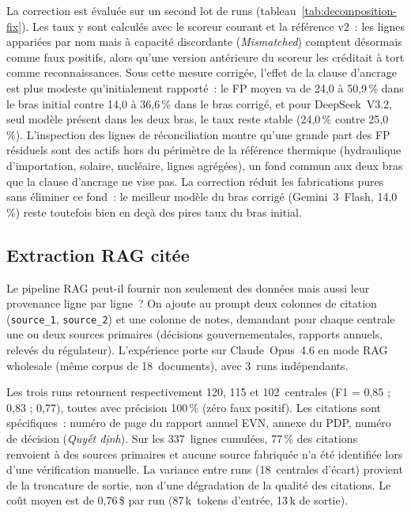 \documentclass[a4paper,11pt]{report}
\begin{document}
La correction est évaluée sur un second lot de runs (tableau~\ref{tab:decomposition-fix}). Les taux y sont calculés avec le scoreur courant et la référence v2~: les lignes appariées par nom mais à capacité discordante (\emph{Mismatched}) comptent désormais comme faux positifs, alors qu'une version antérieure du scoreur les créditait à tort comme reconnaissances. Sous cette mesure corrigée, l'effet de la clause d'ancrage est plus modeste qu'initialement rapporté~: le FP moyen va de 24,0 à 50,9\,\% dans le bras initial contre 14,0 à 36,6\,\% dans le bras corrigé, et pour DeepSeek~V3.2, seul modèle présent dans les deux bras, le taux reste stable (24,0\,\% contre 25,0\,\%). L'inspection des lignes de réconciliation montre qu'une grande part des FP résiduels sont des actifs hors du périmètre de la référence thermique (hydraulique d'importation, solaire, nucléaire, lignes agrégées), un fond commun aux deux bras que la clause d'ancrage ne vise pas. La correction réduit les fabrications pures sans éliminer ce fond~: le meilleur modèle du bras corrigé (Gemini~3~Flash, 14,0\,\%) reste toutefois bien en deçà des pires taux du bras initial.


\subsection{Extraction RAG citée}\label{sec:rag_cited}

Le pipeline RAG peut-il fournir non seulement des données mais aussi leur provenance ligne par ligne~? On ajoute au prompt deux colonnes de citation (\texttt{source\_1}, \texttt{source\_2}) et une colonne de notes, demandant pour chaque centrale une ou deux sources primaires (décisions gouvernementales, rapports annuels, relevés du régulateur). L'expérience porte sur Claude~Opus~4.6 en mode RAG wholesale (même corpus de 18~documents), avec 3~runs indépendants.

Les trois runs retournent respectivement 120, 115 et 102~centrales (F1 = 0,85 ; 0,83 ; 0,77), toutes avec précision 100\,\% (zéro faux positif). Les citations sont spécifiques~: numéro de page du rapport annuel EVN, annexe du PDP, numéro de décision (\emph{Quyết định}). Sur les 337~lignes cumulées, 77\,\% des citations renvoient à des sources primaires et aucune source fabriquée n'a été identifiée lors d'une vérification manuelle. La variance entre runs (18~centrales d'écart) provient de la troncature de sortie, non d'une dégradation de la qualité des citations. Le coût moyen est de 0,76\,\$ par run (87\,k~tokens d'entrée, 13\,k de sortie).
\end{document}
